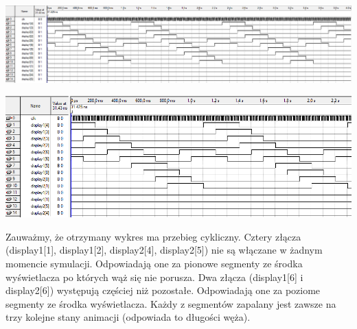 \documentclass{article}
\begin{document}
        \begin{center}
            \includegraphics[width=18cm]{reports/img/fpga_sim_out.png}\\
        \end{center}
        \begin{center}
            \includegraphics[width=18cm]{reports/img/fpga_sim_out2.png}\\
        \end{center}
        Zauważmy, że otrzymany wykres ma przebieg cykliczny. Cztery złącza (display1[1], display1[2], display2[4], display2[5]) nie są włączane w żadnym momencie symulacji. Odpowiadają one za pionowe segmenty ze środka wyświetlacza po których wąż się nie porusza. Dwa złącza (display1[6] i display2[6]) występują częściej niż pozostałe. Odpowiadają one za poziome segmenty ze środka wyświetlacza. Każdy z segmentów zapalany jest zawsze na trzy kolejne stany animacji (odpowiada to długości węża). \\
        
\end{document}
